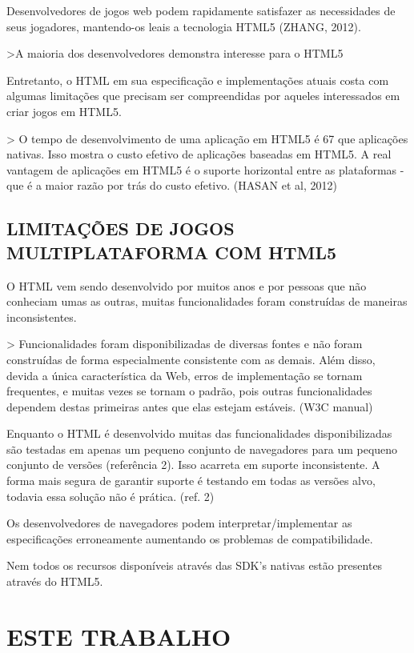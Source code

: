 \documentclass[11pt,a4paper]{article}
\begin{document}
Desenvolvedores de jogos web podem rapidamente satisfazer as
necessidades de seus jogadores, mantendo-os leais a tecnologia HTML5
(ZHANG, 2012).

>A maioria dos desenvolvedores demonstra interesse para o HTML5 

Entretanto, o HTML em sua especificação e implementações atuais
costa com algumas limitações que precisam ser compreendidas por
aqueles interessados em criar jogos em HTML5.

> O tempo de desenvolvimento de uma aplicação em HTML5 é 67%
que aplicações nativas. Isso mostra o custo efetivo de aplicações
baseadas em HTML5. A real vantagem de aplicações em HTML5 é o suporte
horizontal entre as plataformas - que é a maior razão por trás do
custo efetivo. (HASAN et al, 2012)

\subsection{LIMITAÇÕES DE JOGOS MULTIPLATAFORMA COM HTML5}

O HTML vem sendo desenvolvido por muitos anos e por pessoas que não
conheciam umas as outras, muitas funcionalidades foram construídas de
maneiras inconsistentes.

> Funcionalidades foram disponibilizadas de diversas fontes e não foram
construídas de forma especialmente consistente com as demais. Além
disso, devida a única característica da Web, erros de implementação
se tornam frequentes, e muitas vezes se tornam o padrão, pois outras
funcionalidades dependem destas primeiras antes que elas estejam
estáveis. (W3C manual)

Enquanto o HTML é desenvolvido muitas das funcionalidades
disponibilizadas são testadas em apenas um pequeno conjunto de
navegadores para um pequeno conjunto de versões (referência 2). Isso
acarreta em suporte inconsistente. A forma mais segura de garantir
suporte é testando em todas as versões alvo, todavia essa solução
não é prática. (ref. 2)

Os desenvolvedores de navegadores podem interpretar/implementar
as especificações erroneamente aumentando os problemas de
compatibilidade.

Nem todos os recursos disponíveis através das SDK's nativas estão
presentes através do HTML5.

\section{ ESTE TRABALHO}
\end{document}

